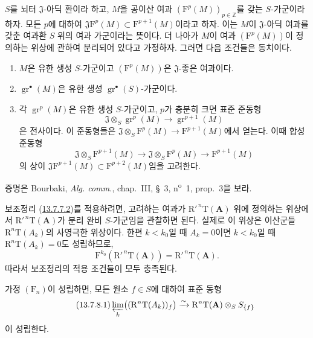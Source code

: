 \begin{lemma}[13.7.7.2]
\label{0.13.7.7.2-fr}
$S$를 뇌터 $\mathfrak J$-아딕 환이라 하고, $M$을 공이산 여과
$(\mathrm F^p(M))_{p\in\mathbb Z}$를 갖는 $S$-가군이라 하자. 모든
$p$에 대하여
$\mathfrak J\mathrm F^p(M)\subset\mathrm F^{p+1}(M)$이라고 하자.
이는 $M$이 $\mathfrak J$-아딕 여과를 갖춘 여과환 $S$ 위의 여과
가군이라는 뜻이다. 더 나아가 $M$이 여과 $(\mathrm F^p(M))$이 정의하는
위상에 관하여 분리되어 있다고 가정하자. 그러면 다음 조건들은
동치이다.
\begin{enumerate}
\item[\rm a)] $M$은 유한 생성 $S$-가군이고 $(\mathrm F^p(M))$은
$\mathfrak J$-좋은 여과이다.
\item[\rm b)] $\operatorname{gr}^\bullet(M)$은 유한 생성
$\operatorname{gr}^\bullet(S)$-가군이다.
\item[\rm c)] 각 $\operatorname{gr}^p(M)$은 유한 생성 $S$-가군이고,
$p$가 충분히 크면 표준 준동형
\begin{equation}
\label{0.13.7.7.3-fr}
\tag{13.7.7.3}
\mathfrak J\otimes_S\operatorname{gr}^p(M)\longrightarrow
\operatorname{gr}^{p+1}(M)
\end{equation}
은 전사이다.
이 준동형들은 $\mathfrak J\otimes_S\mathrm F^p(M)\to
\mathrm F^{p+1}(M)$에서 얻는다. 이때 합성 준동형
\[
\mathfrak J\otimes_S\mathrm F^{p+1}(M)\longrightarrow
\mathfrak J\otimes_S\mathrm F^p(M)\longrightarrow\mathrm F^{p+1}(M)
\]
의 상이
$\mathfrak J\mathrm F^{p+1}(M)\subset\mathrm F^{p+2}(M)$임을
고려한다.
\end{enumerate}
증명은 Bourbaki, \emph{Alg. comm.}, chap.~III, \S~3,
n\textsuperscript{o}~1, prop.~3을 보라.
\end{lemma}

\begin{env}[13.7.7.4]
\label{0.13.7.7.4-fr}
보조정리 (\hyperref[0.13.7.7.2-fr]{13.7.7.2})를 적용하려면, 고려하는
여과가 $\mathrm R'^{\,n}\mathrm T(\mathbf A)$ 위에 정의하는 위상에서
$\mathrm R'^{\,n}\mathrm T(\mathbf A)$가 분리 완비 $S$-가군임을
관찰하면 된다. 실제로 이 위상은 이산군들
$\mathrm R^n\mathrm T(A_k)$의 사영극한 위상이다. 한편 $k<k_0$일 때
$A_k=0$이면 $k<k_0$일 때 $\mathrm R^n\mathrm T(A_k)=0$도 성립하므로,
\[
\mathrm F^{k_0}(\mathrm R'^{\,n}\mathrm T(\mathbf A))=
\mathrm R'^{\,n}\mathrm T(\mathbf A).
\]
따라서 보조정리의 적용 조건들이 모두 충족된다.
\end{env}

\begin{corollary}[13.7.8]
\label{0.13.7.8-fr}
가정 $(\mathrm F_n)$이 성립하면, 모든 원소 $f\in S$에 대하여 표준 동형
\begin{equation}
\label{0.13.7.8.1-fr}
\tag{13.7.8.1}
\varprojlim_k\bigl((\mathrm R^n\mathrm T(A_k))_f\bigr)
\xrightarrow{\sim}\mathrm R^n\mathrm T(\mathbf A)\otimes_S S_{\{f\}}
\end{equation}
이 성립한다.
\end{corollary}

